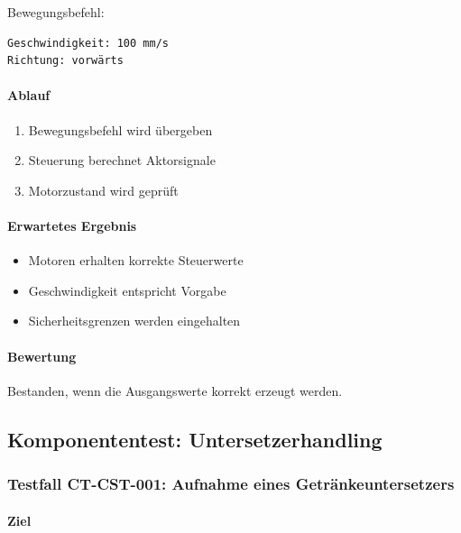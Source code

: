 \documentclass[
  a4paper,
  12pt,
  DIV=12,        %
  parskip=half,  %
  headings=small %
]{scrartcl}
\theoremstyle{definition}
\providecommand{\tightlist}{%
  \setlength{\itemsep}{0pt}\setlength{\parskip}{0pt}}
\theoremstyle{definition}
\begin{document}
Bewegungsbefehl:

\begin{verbatim}
Geschwindigkeit: 100 mm/s
Richtung: vorwärts
\end{verbatim}

\paragraph{Ablauf}\label{ablauf-4}

\begin{enumerate}
\def\labelenumi{\arabic{enumi}.}
\tightlist
\item
  Bewegungsbefehl wird übergeben
\item
  Steuerung berechnet Aktorsignale
\item
  Motorzustand wird geprüft
\end{enumerate}

\paragraph{Erwartetes Ergebnis}\label{erwartetes-ergebnis-4}

\begin{itemize}
\tightlist
\item
  Motoren erhalten korrekte Steuerwerte
\item
  Geschwindigkeit entspricht Vorgabe
\item
  Sicherheitsgrenzen werden eingehalten
\end{itemize}

\paragraph{Bewertung}\label{bewertung-4}

Bestanden, wenn die Ausgangswerte korrekt erzeugt werden.

\subsection{Komponententest:
Untersetzerhandling}\label{komponententest-untersetzerhandling}

\subsubsection{Testfall CT-CST-001: Aufnahme eines
Getränkeuntersetzers}\label{testfall-ct-cst-001-aufnahme-eines-getruxe4nkeuntersetzers}

\paragraph{Ziel}\label{ziel-5}
\end{document}
